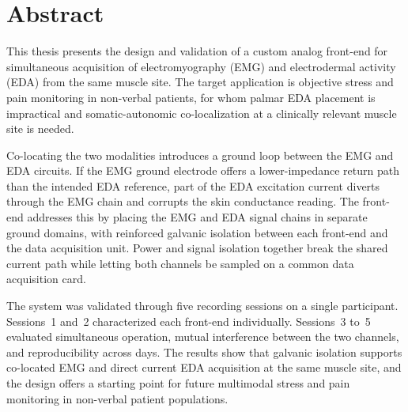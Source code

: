 \chapter*{Abstract}

This thesis presents the design and validation of a custom analog front-end for simultaneous acquisition of electromyography (EMG) and electrodermal activity (EDA) from the same muscle site. The target application is objective stress and pain monitoring in non-verbal patients, for whom palmar EDA placement is impractical and somatic-autonomic co-localization at a clinically relevant muscle site is needed.

Co-locating the two modalities introduces a ground loop between the EMG and EDA circuits. If the EMG ground electrode offers a lower-impedance return path than the intended EDA reference, part of the EDA excitation current diverts through the EMG chain and corrupts the skin conductance reading. The front-end addresses this by placing the EMG and EDA signal chains in separate ground domains, with reinforced galvanic isolation between each front-end and the data acquisition unit. Power and signal isolation together break the shared current path while letting both channels be sampled on a common data acquisition card.

The system was validated through five recording sessions on a single participant. Sessions~1 and~2 characterized each front-end individually. Sessions~3 to~5 evaluated simultaneous operation, mutual interference between the two channels, and reproducibility across days. The results show that galvanic isolation supports co-located EMG and direct current EDA acquisition at the same muscle site, and the design offers a starting point for future multimodal stress and pain monitoring in non-verbal patient populations.